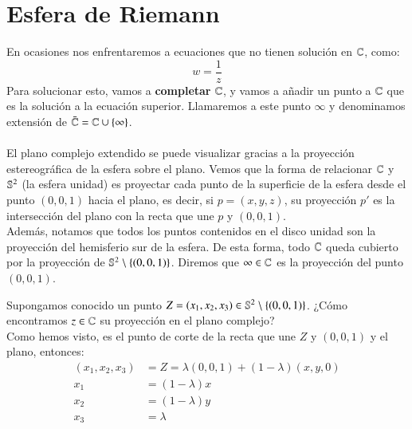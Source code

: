 \section{Esfera de Riemann}
    En ocasiones nos enfrentaremos a ecuaciones que no tienen solución en $\C$, como:
    $$
        w = \frac{1}{z}
    $$
    Para solucionar esto, vamos a \textbf{completar} $\C$, y vamos a añadir un punto a $\C$ que es la solución a la ecuación superior. Llamaremos a este punto $\infty$ y denominamos extensión de $\bar \C = \C \cup \sdf{\infty}$.\\\\
    El plano complejo extendido se puede visualizar gracias a la proyección estereográfica de la esfera sobre el plano.
    Vemos que la forma de relacionar $\C$ y $\S^2$ (la esfera unidad) es proyectar cada punto de la superficie de la esfera desde el punto $(0, 0, 1)$ hacia el plano, es decir, si $p = (x, y, z)$, su proyección $p'$ es la intersección del plano con la recta que une $p$ y $(0, 0, 1)$.\\
    Además, notamos que todos los puntos contenidos en el disco unidad son la proyección del hemisferio sur de la esfera. De esta forma, todo $\C$ queda cubierto por la proyección de $\S^2\setminus\sdf{(0, 0, 1)}$. Diremos que $\infty \in \C$ es la proyección del punto $(0, 0, 1)$.

    \begin{obs}
        Supongamos conocido un punto $Z = (x_1, x_2, x_3) \in \S^2\setminus\sdf{(0, 0, 1)}$. ¿Cómo encontramos $z\in\C$ su proyección en el plano complejo?\\

        Como hemos visto, es el punto de corte de la recta que une $Z$ y $(0, 0, 1)$ y el plano, entonces:
        \begin{align*}
            (x_1, x_2, x_3) &= Z = \lambda (0, 0, 1) + (1-\lambda)(x, y, 0)\\
            x_1 &= (1-\lambda) x\\
            x_2 &= (1-\lambda) y\\
            x_3 &= \lambda
        \end{align*}
    \end{obs}
